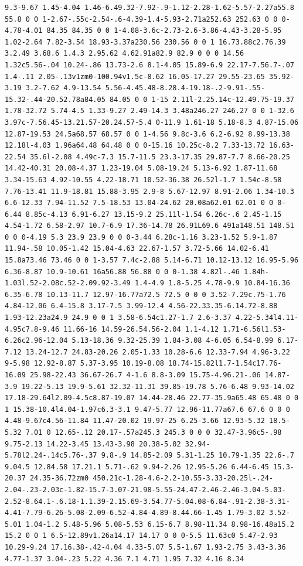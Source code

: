 \documentclass[11pt]{article}
\begin{document}
\begin{enumerate}
\begin{verbatim}
9.3-9.67 1.45-4.04 1.46-6.49.32-7.92-.9-1.12-2.28-1.62-5.57-2.27a55.8 55.8 0 0 1-2.67-.55c-2.54-.6-4.39-1.4-5.93-2.71a252.63 252.63 0 0 0-4.78-4.01 84.35 84.35 0 0 1-4.08-3.6c-2.73-2.6-3.86-4.43-3.28-5.95 1.02-2.64 7.82-3.54 18.93-3.37a230.56 230.56 0 0 1 16.73.88c2.76.39 3.2.49 3.68.6 1.4.3 2.95.62 4.62.91a82.9 82.9 0 0 0 14.56 1.32c5.56-.04 10.24-.86 13.73-2.6 8.1-4.05 15.89-6.9 22.17-7.56.7-.07 1.4-.11 2.05-.13v1zm0-100.94v1.5c-8.62 16.05-17.27 29.55-23.65 35.92-3.19 3.2-7.62 4.9-13.54 5.56-4.45.48-8.28.4-19.18-.2-9.91-.55-15.32-.44-20.52.78a84.05 84.05 0 0 1-15 2.11l-2.25.14c-12.49.75-19.37 1.78-32.72 5.74-4.5 1.33-9.27 2.49-14.3 3.48a246.27 246.27 0 0 1-32.6 3.97c-7.56.45-13.21.57-20.24.57-5.4 0-11.9 1.61-18 5.18-8.3 4.87-15.06 12.87-19.53 24.5a68.57 68.57 0 0 1-4.56 9.8c-3.6 6.2-6.92 8.99-13.38 12.18l-4.03 1.96a64.48 64.48 0 0 0-15.16 10.25c-8.2 7.33-13.72 16.63-22.54 35.6l-2.08 4.49c-7.3 15.7-11.5 23.3-17.35 29.87-7.7 8.66-20.25 14.42-40.31 20.08-4.37 1.23-19.04 5.08-19.24 5.13-6.92 1.87-11.68 3.34-15.63 4.92-10.55 4.22-18.71 10.52-36.38 26.52l-1.7 1.54c-8.58 7.76-13.41 11.9-18.81 15.88-3.95 2.9-8 5.67-12.97 8.91-2.06 1.34-10.3 6.6-12.33 7.94-11.52 7.5-18.53 13.04-24.62 20.08a62.01 62.01 0 0 0-6.44 8.85c-4.13 6.91-6.27 13.15-9.2 25.11l-1.54 6.26c-.6 2.45-1.15 4.54-1.72 6.58-2.97 10.7-6.9 17.36-14.78 26.91L69.6 491a148.51 148.51 0 0 0-4.19 5.3 23.9 23.9 0 0 0-3.44 6.28c-1.16 3.23-1.52 5.9-1.87 11.94-.58 10.05-1.42 15.04-4.63 22.67-1.57 3.72-5.66 14.02-6.41 15.8a73.46 73.46 0 0 1-3.57 7.4c-2.88 5.14-6.71 10.12-13.12 16.95-5.96 6.36-8.87 10.9-10.61 16a56.88 56.88 0 0 0-1.38 4.82l-.46 1.84h-1.03l.52-2.08c.52-2.09.92-3.49 1.4-4.9 1.8-5.25 4.78-9.9 10.84-16.36 6.35-6.78 10.13-11.7 12.97-16.77a72.5 72.5 0 0 0 3.52-7.29c.75-1.76 4.84-12.06 6.4-15.8 3.17-7.5 3.99-12.4 4.56-22.33.35-6.14.72-8.88 1.93-12.23a24.9 24.9 0 0 1 3.58-6.54c1.27-1.7 2.6-3.37 4.22-5.34l4.11-4.95c7.8-9.46 11.66-16 14.59-26.54.56-2.04 1.1-4.12 1.71-6.56l1.53-6.26c2.96-12.04 5.13-18.36 9.32-25.39 1.84-3.08 4-6.05 6.54-8.99 6.17-7.12 13.24-12.7 24.83-20.26 2.05-1.33 10.28-6.6 12.33-7.94 4.96-3.22 9-5.98 12.92-8.87 5.37-3.95 10.19-8.08 18.74-15.82l1.7-1.54c17.76-16.09 25.98-22.43 36.67-26.7 4-1.6 8.8-3.09 15.75-4.96.21-.06 14.87-3.9 19.22-5.13 19.9-5.61 32.32-11.31 39.85-19.78 5.76-6.48 9.93-14.02 17.18-29.64l2.09-4.5c8.87-19.07 14.44-28.46 22.77-35.9a65.48 65.48 0 0 1 15.38-10.4l4.04-1.97c6.3-3.1 9.47-5.77 12.96-11.77a67.6 67.6 0 0 0 4.48-9.67c4.56-11.84 11.47-20.02 19.97-25 6.25-3.66 12.93-5.32 18.5-5.32 7.01 0 12.65-.12 20.17-.57a245.3 245.3 0 0 0 32.47-3.96c5-.98 9.75-2.13 14.22-3.45 13.43-3.98 20.38-5.02 32.94-5.78l2.24-.14c5.76-.37 9.8-.9 14.85-2.09 5.31-1.25 10.79-1.35 22.6-.7 9.04.5 12.84.58 17.21.1 5.71-.62 9.94-2.26 12.95-5.26 6.44-6.45 15.3-20.37 24.35-36.72zm0 450.21c-1.28-4.6-2.2-10.55-3.33-20.25l-.24-2.04-.23-2.03c-1.82-15.7-3.07-21.98-5.55-24.47-2.46-2.46-3.04-5.03-2.52-8.64.1-.6.18-1.1.39-2.15.69-3.54.77-5.04.08-6.84-.91-2.38-3.31-4.41-7.79-6.26-5.08-2.09-6.52-4.84-4.89-8.44.66-1.45 1.79-3.02 3.52-5.01 1.04-1.2 5.48-5.96 5.08-5.53 6.15-6.7 8.98-11.34 8.98-16.48a15.2 15.2 0 0 1 6.5-12.89v1.26a14.17 14.17 0 0 0-5.5 11.63c0 5.47-2.93 10.29-9.24 17.16.38-.42-4.04 4.33-5.07 5.5-1.67 1.93-2.75 3.43-3.36 4.77-1.37 3.04-.23 5.22 4.36 7.1 4.71 1.95 7.32 4.16 8.34 
\end{verbatim}
\end{enumerate}
\end{document}
